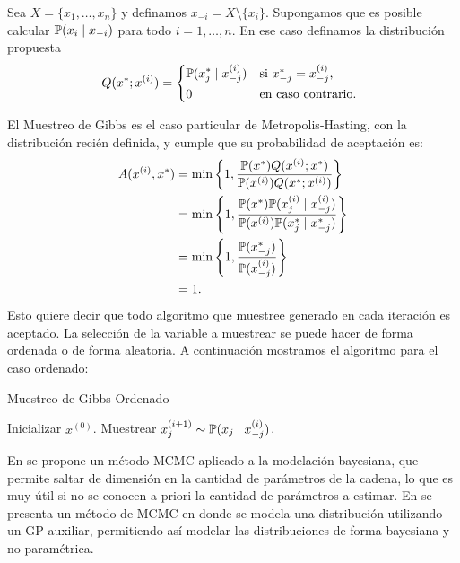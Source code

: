 Sea \(X = \{x_1, \dotsc, x_n\}\) y definamos \(x_{-i} = X \setminus \{x_i\}\). Supongamos que es posible calcular \(\mathbb{P}(x_i \mid x_{-i})\) para todo \(i = 1, \dotsc, n\). En ese caso definamos la distribución propuesta
\[ Q(x^{\ast}; x^{(i)}) = \begin{dcases*}
\prob(x_j^{\ast} \mid x_{-j}^{(i)})	& si \(x_{-j}^{\ast} = x_{-j}^{(i)}\),\\
0									& en caso contrario.
\end{dcases*} \]

El Muestreo de Gibbs es el caso particular de Metropolis-Hasting, con la distribución recién definida, y cumple que su probabilidad de aceptación es:
\begin{align*}
A(x^{(i)}, x^{\ast})	&= \min \left\{1, \frac{\mathbb{P}(x^{\ast})Q(x^{(i)}; x^{\ast})}{\mathbb{P}(x^{(i)}) Q(x^{\ast}; x^{(i)})} \right\}\\
&= \min \left\{1, \frac{\mathbb{P}(x^{\ast}) \mathbb{P}(x_j^{(i)} \mid x_{-j}^{(i)})}{\mathbb{P}(x^{(i)}) \mathbb{P}(x_j^{\ast} \mid x_{-j}^{\ast})} \right\}\\
&= \min \left\{1, \frac{\mathbb{P}(x_{-j}^{\ast})}{\mathbb{P}(x_{-j}^{(i)})} \right\}\\
&= 1.
\end{align*}
Esto quiere decir que todo algoritmo que muestree generado en cada iteración es aceptado. La selección de la variable a muestrear se puede hacer de forma ordenada o de forma aleatoria. A continuación mostramos el algoritmo para el caso ordenado:
\begin{algorithm}[h]
	\caption{Muestreo de Gibbs Ordenado}
	\begin{algorithmic}[1]
		\State Inicializar \(x^{(0)}\).
		\State Muestrear \(x_j^{(i+1)} \sim \mathbb{P}(x_j \mid x_{-j}^{(i)})\).
		\EndFor
		\EndFor
	\end{algorithmic}
\end{algorithm}

En \cite{green1995reversible} se propone un método MCMC aplicado a la modelación bayesiana, que permite saltar de dimensión en la cantidad de parámetros de la cadena, lo que es muy útil si no se conocen a priori la cantidad de parámetros a estimar. En \cite{murray2008gaussian} se presenta un método de MCMC en donde se modela una distribución utilizando un GP auxiliar, permitiendo así modelar las distribuciones de forma bayesiana y no paramétrica.


